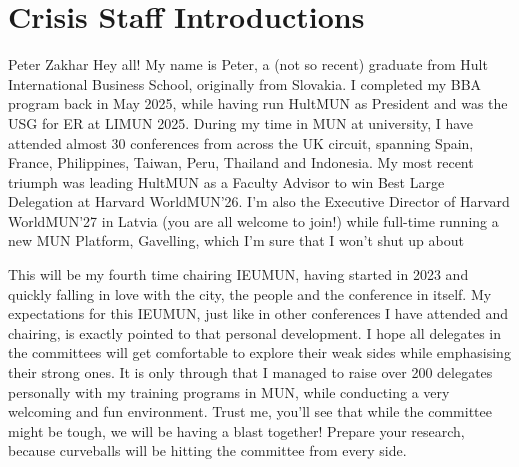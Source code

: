 \section{Crisis Staff Introductions}

\begin{chairletter}[Chair]{Peter Zakhar}
Hey all! My name is Peter, a (not so recent) graduate from Hult International Business School, originally from Slovakia. I completed my BBA program back in May 2025, while having run HultMUN as President and was the USG for ER at LIMUN 2025. During my time in MUN at university, I have attended almost 30 conferences from across the UK circuit, spanning Spain, France, Philippines, Taiwan, Peru, Thailand and Indonesia. My most recent triumph was leading HultMUN as a Faculty Advisor to win Best Large Delegation at Harvard WorldMUN’26. I’m also the Executive Director of Harvard WorldMUN’27 in Latvia (you are all welcome to join!) while full-time running a new MUN Platform, Gavelling, which I’m sure that I won’t shut up about 🙂

This will be my fourth time chairing IEUMUN, having started in 2023 and quickly falling in love with the city, the people and the conference in itself. My expectations for this IEUMUN, just like in other conferences I have attended and chairing, is exactly pointed to that personal development. I hope all delegates in the committees will get comfortable to explore their weak sides while emphasising their strong ones. It is only through that I managed to raise over 200 delegates personally with my training programs in MUN, while conducting a very welcoming and fun environment. Trust me, you’ll see that while the committee might be tough, we will be having a blast together! Prepare your research, because curveballs will be hitting the committee from every side.

\end{chairletter}

